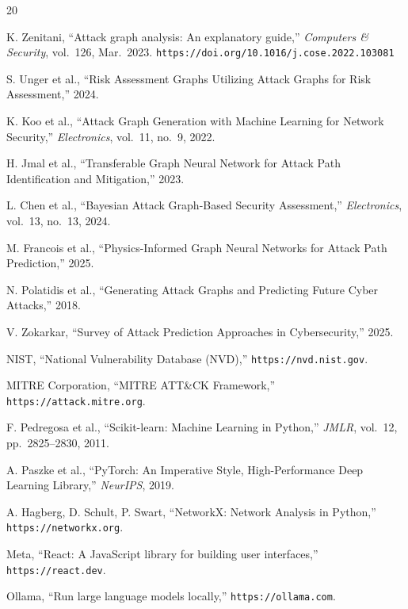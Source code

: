 \documentclass[12pt, a4paper]{report}
\begin{document}
\begin{thebibliography}{20}

K. Zenitani, ``Attack graph analysis: An explanatory guide,'' \textit{Computers \& Security}, vol.~126, Mar.~2023. \texttt{https://doi.org/10.1016/j.cose.2022.103081}

S. Unger et al., ``Risk Assessment Graphs Utilizing Attack Graphs for Risk Assessment,'' 2024.

K. Koo et al., ``Attack Graph Generation with Machine Learning for Network Security,'' \textit{Electronics}, vol.~11, no.~9, 2022.

H. Jmal et al., ``Transferable Graph Neural Network for Attack Path Identification and Mitigation,'' 2023.

L. Chen et al., ``Bayesian Attack Graph-Based Security Assessment,'' \textit{Electronics}, vol.~13, no.~13, 2024.

M. Francois et al., ``Physics-Informed Graph Neural Networks for Attack Path Prediction,'' 2025.

N. Polatidis et al., ``Generating Attack Graphs and Predicting Future Cyber Attacks,'' 2018.

V. Zokarkar, ``Survey of Attack Prediction Approaches in Cybersecurity,'' 2025.

NIST, ``National Vulnerability Database (NVD),'' \texttt{https://nvd.nist.gov}.

MITRE Corporation, ``MITRE ATT\&CK Framework,'' \texttt{https://attack.mitre.org}.

F. Pedregosa et al., ``Scikit-learn: Machine Learning in Python,'' \textit{JMLR}, vol.~12, pp.~2825--2830, 2011.

A. Paszke et al., ``PyTorch: An Imperative Style, High-Performance Deep Learning Library,'' \textit{NeurIPS}, 2019.

A. Hagberg, D. Schult, P. Swart, ``NetworkX: Network Analysis in Python,'' \texttt{https://networkx.org}.

Meta, ``React: A JavaScript library for building user interfaces,'' \texttt{https://react.dev}.

Ollama, ``Run large language models locally,'' \texttt{https://ollama.com}.

\end{thebibliography}
\end{document}
